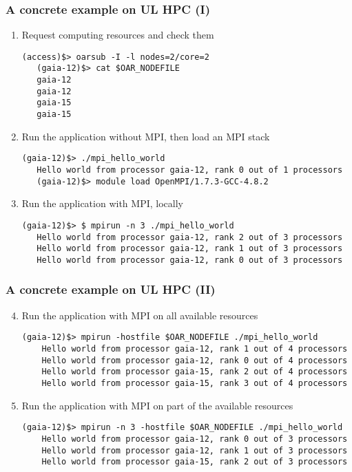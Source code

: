 \documentclass{beamer}
\begin{document}
\begin{frame}[fragile]
  \frametitle{A concrete example on UL HPC (I)}

  \begin{enumerate}
   \item Request computing resources and check them
   \begin{lstlisting}[basicstyle=\tiny,numbers=none]
   (access)$> oarsub -I -l nodes=2/core=2
   (gaia-12)$> cat $OAR_NODEFILE
   gaia-12
   gaia-12
   gaia-15
   gaia-15
\end{lstlisting}
 \pause
 \item Run the application without MPI, then load an MPI stack
   \begin{lstlisting}[basicstyle=\tiny,numbers=none]
   (gaia-12)$> ./mpi_hello_world 
   Hello world from processor gaia-12, rank 0 out of 1 processors
   (gaia-12)$> module load OpenMPI/1.7.3-GCC-4.8.2
   \end{lstlisting}
 \pause
 \item Run the application with MPI, locally
   \begin{lstlisting}[basicstyle=\tiny,numbers=none]
   (gaia-12)$> $ mpirun -n 3 ./mpi_hello_world 
   Hello world from processor gaia-12, rank 2 out of 3 processors
   Hello world from processor gaia-12, rank 1 out of 3 processors
   Hello world from processor gaia-12, rank 0 out of 3 processors
   \end{lstlisting}
 \end{enumerate}
\end{frame}

\begin{frame}[fragile]
  \frametitle{A concrete example on UL HPC (II)}
   \begin{enumerate}
     \setcounter{enumi}{3}
     \item Run the application with MPI on all available resources
      \begin{lstlisting}[basicstyle=\tiny,numbers=none]
        (gaia-12)$> mpirun -hostfile $OAR_NODEFILE ./mpi_hello_world 
	Hello world from processor gaia-12, rank 1 out of 4 processors
	Hello world from processor gaia-12, rank 0 out of 4 processors
	Hello world from processor gaia-15, rank 2 out of 4 processors
	Hello world from processor gaia-15, rank 3 out of 4 processors
        \end{lstlisting}
	\pause
      \item  Run the application with MPI on part of the available resources
        \begin{lstlisting}[basicstyle=\tiny,numbers=none]
	(gaia-12)$> mpirun -n 3 -hostfile $OAR_NODEFILE ./mpi_hello_world 
	Hello world from processor gaia-12, rank 0 out of 3 processors
	Hello world from processor gaia-12, rank 1 out of 3 processors
	Hello world from processor gaia-15, rank 2 out of 3 processors
	\end{lstlisting}
  \end{enumerate}
\end{frame}
\end{document}
